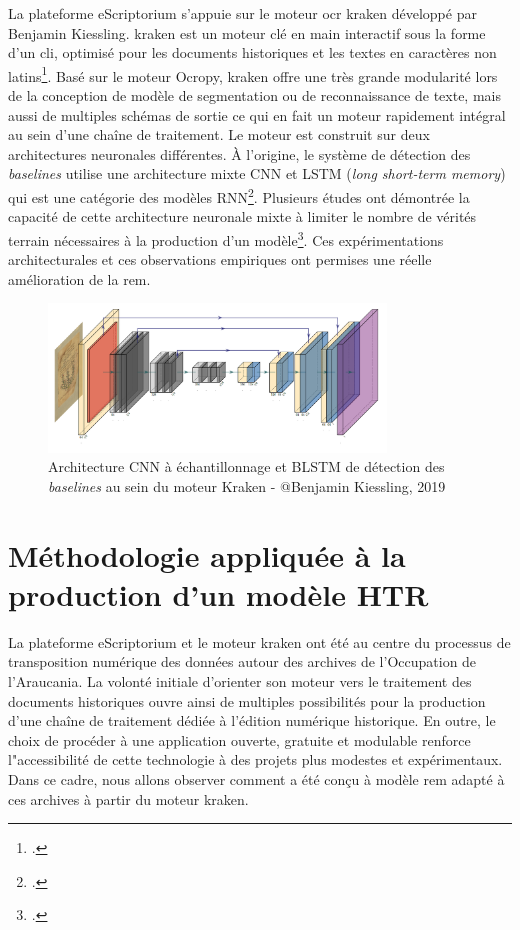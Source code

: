 	La plateforme \gls{eScriptorium} s'appuie sur le moteur \gls{ocr} \gls{kraken} développé par Benjamin Kiessling. \gls{kraken} est un moteur clé en main interactif sous la forme d'un \gls{cli}, optimisé pour les documents historiques et les textes en caractères non latins\footcite{kiesslingKrakenUniversalText2019a}. Basé sur le moteur Ocropy, \gls{kraken} offre une très grande modularité lors de la conception de modèle de segmentation ou de reconnaissance de texte, mais aussi de multiples schémas de sortie ce qui en fait un moteur rapidement intégral au sein d'une chaîne de traitement. Le moteur est construit sur deux architectures neuronales différentes. À l’origine, le système de détection des \textit{baselines} utilise une architecture mixte \gls{CNN} et LSTM (\textit{long short-term memory}) qui est une catégorie des modèles \gls{RNN}\footcite{toselliDigitalEditionsDistant2021a}. Plusieurs études ont démontrée la capacité de cette architecture neuronale mixte à limiter le nombre de vérités terrain nécessaires à la production d'un modèle\footcite{aradillasBoostingHandwritingText2018, granetTransferLearningHandwriting2018}. Ces expérimentations architecturales et ces observations empiriques ont permises une réelle amélioration de la \gls{rem}.
	
	\begin{figure}[h!]
	    \centering
	    \includegraphics[width=0.8\textwidth]{annexes/schema/CNN_network.png}
	    \caption{Architecture \gls{CNN} à échantillonnage et BLSTM de détection des \textit{baselines} au sein du moteur Kraken - @Benjamin Kiessling, 2019}
	    \label{fig:cnn_archi}
	\end{figure}
	
	
	\section{Méthodologie appliquée à la production d'un modèle HTR}
	
	La plateforme \gls{eScriptorium} et le moteur \gls{kraken} ont été au centre du processus de transposition numérique des données autour des archives de l'Occupation de l'Araucania. La volonté initiale d'orienter son moteur vers le traitement des documents historiques ouvre ainsi de multiples possibilités pour la production d'une chaîne de traitement dédiée à l'édition numérique historique. En outre, le choix de procéder à une application ouverte, gratuite et modulable renforce l"accessibilité de cette technologie à des projets plus modestes et expérimentaux.
	Dans ce cadre, nous allons observer comment a été conçu à modèle \gls{rem} adapté à ces archives à partir du moteur \gls{kraken}.
	
